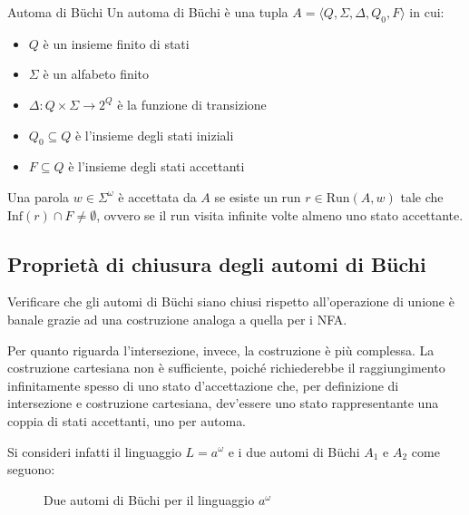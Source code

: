 \begin{definition}{Automa di Büchi}
  Un automa di Büchi è una tupla \(A = \langle Q, \Sigma, \Delta, Q_0, F\rangle\) in cui:
  \begin{itemize}
    \item \(Q\) è un insieme finito di stati
    \item \(\Sigma\) è un alfabeto finito
    \item \(\Delta: Q \times \Sigma \to 2^Q\) è la funzione di transizione
    \item \(Q_0 \subseteq Q\) è l'insieme degli stati iniziali
    \item \(F \subseteq Q\) è l'insieme degli stati accettanti
  \end{itemize}
  Una parola \(w \in \Sigma^\omega\) è accettata da \(A\) se esiste un run \(r \in \text{Run}(A, w)\) tale che \(\text{Inf}(r) \cap F \neq \emptyset\), ovvero se il run visita infinite volte almeno uno stato accettante.
\end{definition}

\subsection{Proprietà di chiusura degli automi di Büchi}

Verificare che gli automi di Büchi siano chiusi rispetto all'operazione di unione è banale grazie ad una costruzione analoga a quella per i NFA.

Per quanto riguarda l'intersezione, invece, la costruzione è più complessa. La costruzione cartesiana non è sufficiente, poiché richiederebbe il raggiungimento infinitamente spesso di uno stato d'accettazione che, per definizione di intersezione e costruzione cartesiana, dev'essere uno stato rappresentante una coppia di stati accettanti, uno per automa.

Si consideri infatti il linguaggio \(L = a^\omega\) e i due automi di Büchi \(A_1\) e \(A_2\) come seguono:

\begin{figure}[H]
  \centering
  \caption{Due automi di Büchi per il linguaggio \(a^\omega\)}\label{fig:buchi_intersection_counterexample}
\end{figure}

